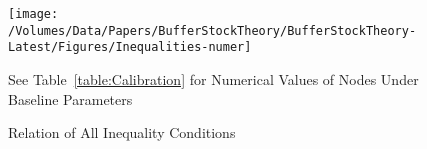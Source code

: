 \begin{figure}[h]
  \centerline{
    \texttt{[image: /Volumes/Data/Papers/BufferStockTheory/BufferStockTheory-Latest/Figures/Inequalities-numer]}
  }
  \caption{Relation of All Inequality Conditions} \label{fig:InequalitiesNumerical}
\centerline{See Table~\ref{table:Calibration} for Numerical Values of Nodes Under Baseline Parameters}
\end{figure}
